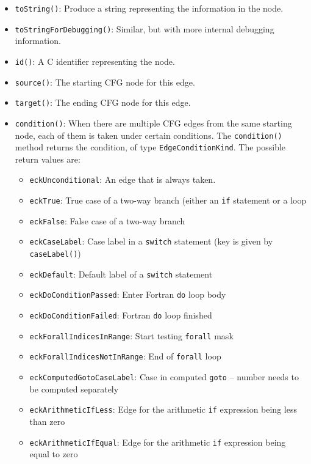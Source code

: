 \begin{itemize}
\item \lstinline{toString()}: Produce a string representing the information
      in the node.
\item \lstinline{toStringForDebugging()}: Similar, but with more internal
      debugging information.
\item \lstinline{id()}: A C identifier representing the node.
\item \lstinline{source()}: The starting CFG node for this edge.
\item \lstinline{target()}: The ending CFG node for this edge.
\item \lstinline{condition()}: When there are multiple CFG edges from the
      same starting node, each of them is taken under certain conditions.  The
\lstinline{condition()} method returns the condition, of type
\lstinline{EdgeConditionKind}.  The possible return values are:
  \begin{itemize}
  \item \lstinline{eckUnconditional}: An edge that is always taken.
  \item \lstinline{eckTrue}: True case of a two-way branch (either an
                             \lstinline{if} statement or a loop
  \item \lstinline{eckFalse}: False case of a two-way branch
  \item \lstinline{eckCaseLabel}: Case label in a \lstinline{switch} statement (key is given by \lstinline{caseLabel()})
  \item \lstinline{eckDefault}: Default label of a \lstinline{switch} statement
  \item \lstinline{eckDoConditionPassed}: Enter Fortran \lstinline{do} loop body
  \item \lstinline{eckDoConditionFailed}: Fortran \lstinline{do} loop finished
  \item \lstinline{eckForallIndicesInRange}: Start testing \lstinline{forall} mask
  \item \lstinline{eckForallIndicesNotInRange}: End of \lstinline{forall} loop
  \item \lstinline{eckComputedGotoCaseLabel}: Case in computed \lstinline{goto} -- number needs to be computed separately
  \item \lstinline{eckArithmeticIfLess}: Edge for the arithmetic \lstinline{if} expression being less than zero
  \item \lstinline{eckArithmeticIfEqual}: Edge for the arithmetic \lstinline{if} expression being equal to zero

\end{itemize}
\end{itemize}

